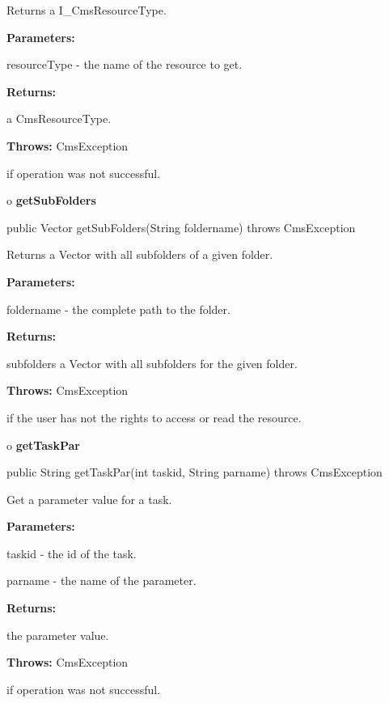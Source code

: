 \begin{description}
\htmlDD Returns a I\_CmsResourceType. 

\begin{description}
\item {\bf Parameters:}  

resourceType - the name of the resource to get.  
\item {\bf Returns:}  

a CmsResourceType.  
\item {\bf Throws:} CmsException  

if operation was not successful.  
\end{description}

\end{description}

o {\bf getSubFolders} 

\begin{PRE}
 public Vector getSubFolders(String foldername) throws CmsException
\end{PRE}

\begin{description}
\htmlDD Returns a Vector with all subfolders of a given folder. 

\begin{description}
\item {\bf Parameters:}  

foldername - the complete path to the folder.  
\item {\bf Returns:}  

subfolders a Vector with all subfolders for the given folder.  
\item {\bf Throws:} CmsException  

if the user has not the rights to access or read the resource.  
\end{description}

\end{description}

o {\bf getTaskPar} 

\begin{PRE}
 public String getTaskPar(int taskid,
                          String parname) throws CmsException
\end{PRE}

\begin{description}
\htmlDD Get a parameter value for a task. 

\begin{description}
\item {\bf Parameters:}  

taskid - the id of the task.  

parname - the name of the parameter.  
\item {\bf Returns:}  

the parameter value.  
\item {\bf Throws:} CmsException  

if operation was not successful.  
\end{description}

\end{description}

